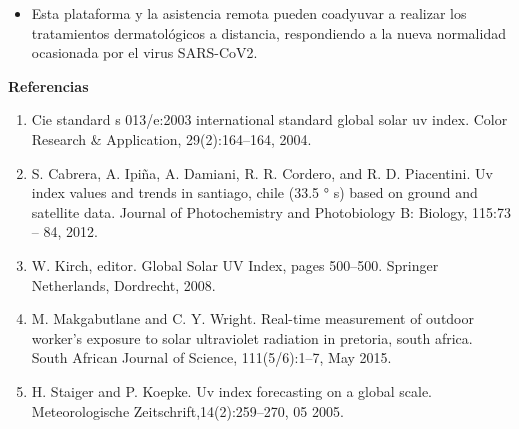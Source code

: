 \documentclass{article}
\begin{document}
\begin{multicols}{2}
\begin{itemize}
    \item Esta plataforma y la asistencia remota pueden coadyuvar a realizar los tratamientos 
    dermatológicos a distancia, respondiendo a la nueva normalidad ocasionada por el virus SARS-CoV2.
\end{itemize}
\begin{center}
\begin{shaded}
\textbf{\textcolor{na}{Referencias}}
\end{shaded}
\changefontsizes{7pt}
% 
% 
\begin{enumerate}
\item Cie standard s 013/e:2003 international standard global solar uv index. Color Research \& Application, 29(2):164–164, 2004.
\item  S. Cabrera, A. Ipiña, A. Damiani, R. R. Cordero, and R. D. Piacentini. Uv index values and trends
in santiago, chile (33.5 ° s) based on ground and satellite data. Journal of Photochemistry and
Photobiology B: Biology, 115:73 – 84, 2012.
\item  W. Kirch, editor. Global Solar UV Index, pages 500–500. Springer Netherlands, Dordrecht, 2008.
\item M. Makgabutlane and C. Y. Wright. Real-time measurement of outdoor worker’s exposure to solar
ultraviolet radiation in pretoria, south africa. South African Journal of Science, 111(5/6):1–7, May
2015.
\item H. Staiger and P. Koepke. Uv index forecasting on a global scale. Meteorologische Zeitschrift,14(2):259–270, 05 2005.
\end{enumerate}
\end{center}
\end{multicols}
\end{document}

